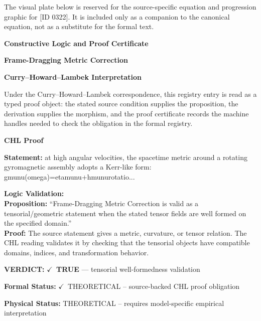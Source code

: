 \begingroup\footnotesize\sloppy
The visual plate below is reserved for the source-specific equation and progression graphic for [ID 0322]. It is included only as a companion to the canonical equation, not as a substitute for the formal text.
\par\endgroup
\ifTZPDarkEdition
{}
\fi

\clearpage
\begingroup\tzpsupportsetup
\noindent\textbf{\fontsize{10.8pt}{12.8pt}\selectfont [ID 0322] Constructive Logic and Proof Certificate}\par
\noindent\textbf{\fontsize{10pt}{12pt}\selectfont Frame-Dragging Metric Correction}\par
\vspace{0.45em}
\begingroup
\footnotesize
\setlength{\parskip}{0.22em}
\setlength{\parindent}{0pt}
\noindent\textbf{Curry--Howard--Lambek Interpretation}\par
Under the Curry--Howard--Lambek correspondence, this registry entry is read as a typed proof
object: the stated source condition supplies the proposition, the derivation supplies the
morphism, and the proof certificate records the machine handles needed to check the obligation
in the formal registry.

\vspace{0.45em}
\noindent\textbf{CHL Proof}\par
\textbf{Statement:} at high angular velocities, the spacetime metric around a rotating gyromagnetic assembly
adopts a Kerr-like form: gmunu(omega)=etamunu+hmunurotatio...

\textbf{Logic Validation:}\\
\textbf{Proposition:} ``Frame-Dragging Metric Correction is valid as a tensorial/geometric statement when the
stated tensor fields are well formed on the specified domain.''\\
\textbf{Proof:} The source statement gives a metric, curvature, or tensor relation. The CHL reading
validates it by checking that the tensorial objects have compatible domains, indices,
and transformation behavior.

\textbf{VERDICT:} \ensuremath{\checkmark}\ \textbf{TRUE} --- tensorial well-formedness validation

\textbf{Formal Status:} \ensuremath{\checkmark}\ THEORETICAL -- source-backed CHL proof obligation

\textbf{Physical Status:} THEORETICAL -- requires model-specific empirical interpretation
\par\vspace{0.45em}
\par
\ifTZPDarkEdition
{}
\fi
\endgroup
\endgroup

